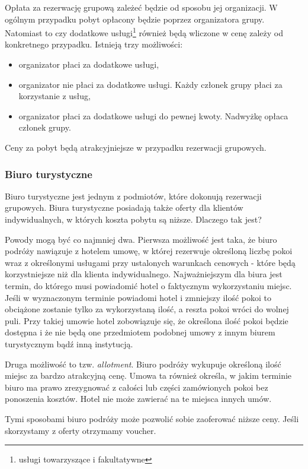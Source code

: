 \documentclass[a4paper,onecolumn,oneside,11pt,wide,floatssmall]{mwrep}
\theoremstyle{definition}
\theoremstyle{plain}%
\theoremstyle{remark}
\begin{document}
Opłata za rezerwację grupową zależeć będzie od sposobu jej organizacji. W 
ogólnym przypadku pobyt opłacony będzie poprzez organizatora grupy. 
Natomiast to czy dodatkowe usługi\footnote{usługi towarzyszące i fakultatywne}
 również będą wliczone w cenę zależy od konkretnego przypadku. Istnieją trzy 
 możliwości:

\begin{itemize}
   \item organizator płaci za dodatkowe usługi,
   \item organizator nie płaci za dodatkowe usługi. Każdy członek grupy 
   płaci za korzystanie z usług,
   \item organizator płaci za dodatkowe usługi do pewnej kwoty. Nadwyżkę 
   opłaca członek grupy.
\end{itemize}

Ceny za pobyt będą atrakcyjniejsze w przypadku rezerwacji grupowych.

\subsubsection{Biuro turystyczne}
\label{biuro-turystyczne}
Biuro turystyczne jest jednym z podmiotów, które dokonują rezerwacji 
grupowych. Biura turystyczne posiadają także oferty dla klientów 
indywidualnych, w których koszta pobytu są niższe. Dlaczego tak jest?

Powody mogą być co najmniej dwa. Pierwsza możliwość jest taka, że biuro 
podróży nawiązuje z hotelem umowę, w której rezerwuje określoną liczbę 
pokoi wraz z określonymi usługami przy ustalonych warunkach cenowych - 
które będą korzystniejsze niż dla klienta indywidualnego. Najważniejszym dla 
biura jest termin, do którego musi powiadomić hotel o faktycznym 
wykorzystaniu miejsc. Jeśli w wyznaczonym terminie powiadomi hotel i 
zmniejszy ilość pokoi to obciążone zostanie tylko za wykorzystaną ilość, a 
reszta pokoi wróci do wolnej puli. Przy takiej umowie hotel zobowiązuje się, 
że określona ilość pokoi będzie dostępna i że nie będą one przedmiotem 
podobnej umowy z innym biurem turystycznym bądź inną instytucją.

Druga możliwość to tzw. \emph{allotment}. Biuro podróży wykupuje określoną 
ilość miejsc za bardzo atrakcyjną cenę. Umowa ta również określa, w jakim 
terminie biuro ma prawo zrezygnować z całości lub części zamówionych pokoi 
bez ponoszenia kosztów. Hotel nie może zawierać na te miejsca innych umów.

Tymi sposobami biuro podróży może pozwolić sobie zaoferować niższe ceny. 
Jeśli skorzystamy z oferty otrzymamy voucher.
\end{document}
